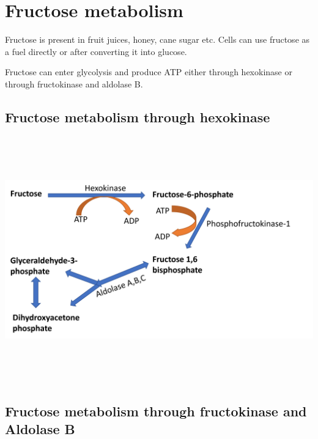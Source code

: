 \documentclass[
]{book}
\begin{document}
\chapter{Fructose metabolism}\label{fructose-metabolism}

Fructose is present in fruit juices, honey, cane sugar etc. Cells can use fructose as a fuel directly or after converting it into glucose.

Fructose can enter glycolysis and produce ATP either through hexokinase or through fructokinase and aldolase B.

\section{Fructose metabolism through hexokinase}\label{fructose-metabolism-through-hexokinase}

\includegraphics[width=\textwidth,height=4.16667in]{Images/Fructose1.png}

\section{Fructose metabolism through fructokinase and Aldolase B}\label{fructose-metabolism-through-fructokinase-and-aldolase-b}
\end{document}
